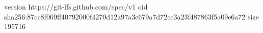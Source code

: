 version https://git-lfs.github.com/spec/v1
oid sha256:87cc8f069ff40792000f4270d12a97a3e679a7d72cc3a23f487863f5a09e6a72
size 195716
